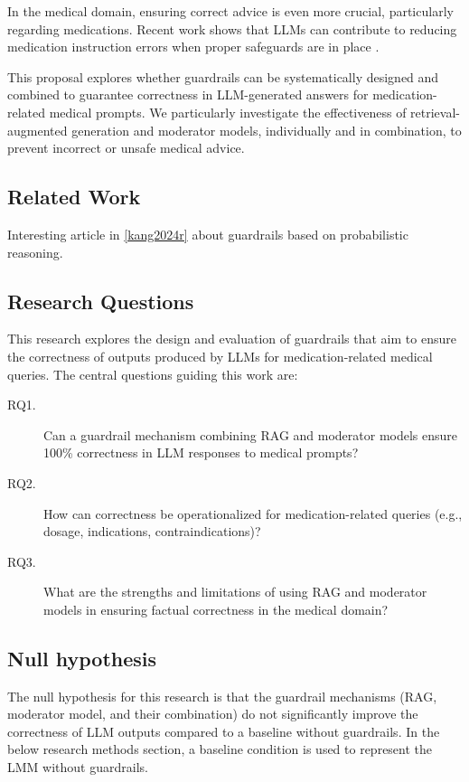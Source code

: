 In the medical domain, ensuring correct advice is even more crucial, particularly regarding medications.
Recent work shows that LLMs can contribute to reducing medication instruction errors when proper safeguards are in place \citep{pais2024medication}.

This proposal explores whether guardrails can be systematically designed and combined to guarantee correctness in LLM-generated answers for medication-related medical prompts.
We particularly investigate the effectiveness of retrieval-augmented generation and moderator models, individually and in combination, to prevent incorrect or unsafe medical advice.

\subsection{Related Work}
Interesting article in \ref{kang2024r} about guardrails based on probabilistic reasoning.

\subsection{Research Questions}
This research explores the design and evaluation of guardrails that aim to ensure the correctness of outputs produced by LLMs for medication-related medical queries.
The central questions guiding this work are:

\begin{description}
    \item[RQ1.] Can a guardrail mechanism combining RAG and moderator models ensure 100\% correctness in LLM responses to medical prompts?
    \item[RQ2.] How can correctness be operationalized for medication-related queries (e.g., dosage, indications, contraindications)?
    \item[RQ3.] What are the strengths and limitations of using RAG and moderator models in ensuring factual correctness in the medical domain?
\end{description}

\subsection{Null hypothesis}
The null hypothesis for this research is that the guardrail mechanisms (RAG, moderator model, and their combination)
do not significantly improve the correctness of LLM outputs compared to a baseline without guardrails.
In the below research methods section, a baseline condition is used to represent the LMM without guardrails.
